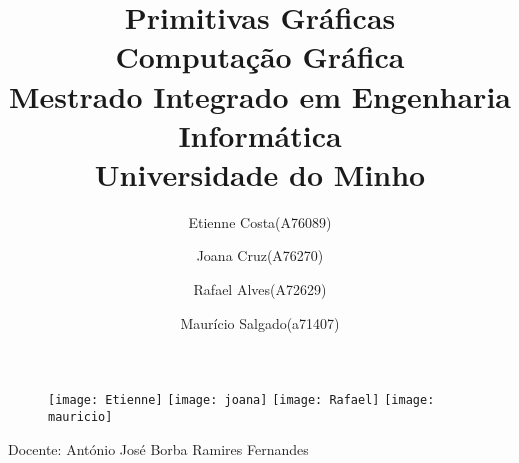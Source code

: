 \title{%
    Primitivas Gráficas \\
    \large Computação Gráfica \\
    Mestrado Integrado em Engenharia Informática \\
    Universidade do Minho
}
\author{Etienne Costa(A76089) \and Joana Cruz(A76270) \and Rafael Alves(A72629) \and Maurício Salgado(a71407)}
\date{}
\maketitle
\begin{figure}[htp]
\centering
\texttt{[image: Etienne]}\quad
\texttt{[image: joana]}
\medskip
\texttt{[image: Rafael]}\quad
\texttt{[image: mauricio]}
\label{pics:blablabla}
\end{figure}
Docente: António José Borba Ramires Fernandes
\newpage